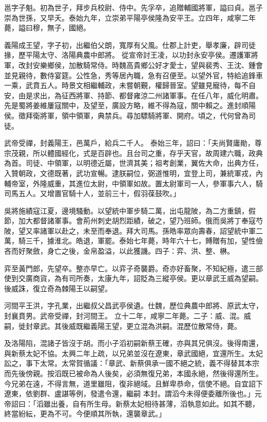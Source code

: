 \begin{pinyinscope}
 邕字子魁。初為世子，拜步兵校尉、侍中。先孚卒，追贈輔國將軍，謚曰貞。邕子崇為世孫，又早夭。泰始九年，立崇弟平陽亭侯隆為安平王。立四年，咸寧二年薨，謚曰穆，無子，國絕。



 義陽成王望，字子初，出繼伯父朗，寬厚有父風。仕郡上計吏，舉孝廉，辟司徒掾，歷平陽太守、洛陽典農中郎將。
 從宣帝討王凌，以功封永安亭侯。遷護軍將軍，改封安樂鄉侯，加散騎常侍。時魏高貴鄉公好才愛士，望與裴秀、王沈、鍾會並見親待，數侍宴筵。公性急，秀等居內職，急有召便至。以望外官，特給追鋒車一乘，武賁五人。時景文相繼輔政，未嘗朝覲，權歸晉室。望雖見寵待，每不自安，由是求出，為征西將軍、持節、都督雍涼二州諸軍事。在任八年，威化明肅。先是蜀將姜維屢寇關中，及望至，廣設方略，維不得為寇，關中賴之。進封順陽侯。徵拜衛將軍，領中領軍，典禁兵。尋加驃騎將軍、開府。頃之，代何曾為司徒。



 武帝受禪，封義陽王，邑萬戶，給兵二千人。
 泰始三年，詔曰：「夫尚賢庸勛，尊宗茂親，所以體國經化，式是百辟也。且台司之重，存乎天官，故周建六職，政典為首。司徒、中領軍，以明德近屬，世濟其美；祖考創業，翼佐大命，出典方任，入贊朝政，文德既著，武功宣暢。逮朕嗣位，弼道惟明，宜登上司，兼統軍戎，內輔帝室，外隆威重，其進位太尉，中領軍如故。置太尉軍司一人，參軍事六人，騎司馬五人。又增置官騎十人，並前三十，假羽葆鼓吹。」



 吳將施績寇江夏，邊境騷動。以望統中軍步騎二萬，出屯龍陂，為二方重鎮，假節，加大都督諸軍事。會荊州刺史胡烈距績，破之，望乃班師。俄而吳將丁奉寇芍
 陂，望又率諸軍以赴之，未至而奉退。拜大司馬。孫皓率眾向壽春，詔望統中軍二萬，騎三千，據淮北。皓退，軍罷。泰始七年薨，時年六十七，賻贈有加，望性儉吝而好聚斂，身亡之後，金帛盈溢，以此獲譏。四子：弈、洪、整、楙。



 弈至黃門郎，先望卒。整亦早亡。以弈子奇襲爵。奇亦好畜聚，不知紀極，遣三部使到交廣商貨，為有司所奏，太康九年，詔貶為三縱亭侯。更以章武王威為望嗣。後威誅，復立奇為棘陽王以嗣望。



 河間平王洪，字孔業，出繼叔父昌武亭侯遺。仕魏，歷位典農中郎將、原武太守，封襄賁男。武帝受禪，封河間王。
 立十二年，咸寧二年薨。二子：威、混。威嗣，徙封章武。其後威既繼義陽王望，更立混為洪嗣。混歷位散常侍，薨。



 及洛陽陷，混諸子皆沒于胡。而小子滔初嗣新蔡王確，亦與其兄俱沒。後得南還，與新蔡太妃不協。太興二年上疏，以兄弟並沒在遼東，章武國絕，宜還所生。太妃訟之，事下太常。太常賀循議：「章武、新蔡俱承一國不絕之統，義不得替其本宗而先後傍親。按滔既已被命為人後矣，必須無復兄弟，本國永絕，然後得還所生。今兄弟在遠，不得言無，道里雖阻，復非絕域。且鮮卑恭命，信使不絕。自宜詔下遼東，依劉群、盧諶等例，發遣令還，繼嗣
 本封。謂滔今未得便委離所後也。」元帝詔曰：「滔雖出養，自有所生母。新蔡太妃相待甚薄，滔執意如此。如其不聽，終當紛紜，更為不可。今便順其所執，還襲章武。」




\end{pinyinscope}
